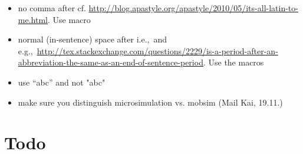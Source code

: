 \begin{itemize}
\item no comma after cf. \url{http://blog.apastyle.org/apastyle/2010/05/its-all-latin-to-me.html}. Use macro \cf

\item normal (in-sentence) space after i.e.,\ and e.g.,\ \url{http://tex.stackexchange.com/questions/2229/is-a-period-after-an-abbreviation-the-same-as-an-end-of-sentence-period}. Use the macros \eg \ie 

\item use ``abc'' and not "abc"

\item make sure you distinguish  \gls{microsimulation} vs. \gls{mobsim} (Mail Kai, 19.11.)

\end{itemize}

\vfill\eject

\section*{Todo}

